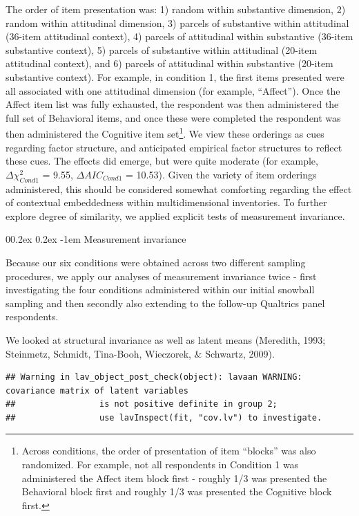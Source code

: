 \documentclass[
  man]{apa6}
\makeatletter
\let\oldparagraph\paragraph
\renewcommand{\paragraph}[1]{\oldparagraph{#1}\mbox{}}
\renewcommand{\paragraph}{\@startsection{paragraph}{4}{\parindent}%
  {0\baselineskip \@plus 0.2ex \@minus 0.2ex}%
  {-1em}%
  {\normalfont\normalsize\bfseries\itshape\typesectitle}}
\makeatother
\begin{document}
The order of item presentation was: 1) random within substantive dimension, 2) random within attitudinal dimension, 3) parcels of substantive within attitudinal (36-item attitudinal context), 4) parcels of attitudinal within substantive (36-item substantive context), 5) parcels of substantive within attitudinal (20-item attitudinal context), and 6) parcels of attitudinal within substantive (20-item substantive context). For example, in condition 1, the first items presented were all associated with one attitudinal dimension (for example, ``Affect''). Once the Affect item list was fully exhausted, the respondent was then administered the full set of Behavioral items, and once these were completed the respondent was then administered the Cognitive item set\footnote{Across conditions, the order of presentation of item ``blocks'' was also randomized. For example, not all respondents in Condition 1 was administered the Affect item block first - roughly 1/3 was presented the Behavioral block first and roughly 1/3 was presented the Cognitive block first.}. We view these orderings as cues regarding factor structure, and anticipated empirical factor structures to reflect these cues. The effects did emerge, but were quite moderate (for example, \(\Delta{\chi^2_{Cond1}}\) = 9.55, \(\Delta{AIC_{Cond1}}\) = 10.53). Given the variety of item orderings administered, this should be considered somewhat comforting regarding the effect of contextual embeddedness within multidimensional inventories. To further explore degree of similarity, we applied explicit tests of measurement invariance.

\hypertarget{measurement-invariance}{%
\paragraph{Measurement invariance}\label{measurement-invariance}}

Because our six conditions were obtained across two different sampling procedures, we apply our analyses of measurement invariance twice - first investigating the four conditions administered within our initial snowball sampling and then secondly also extending to the follow-up Qualtrics panel respondents.

We looked at structural invariance as well as latent means (Meredith, 1993; Steinmetz, Schmidt, Tina-Booh, Wieczorek, \& Schwartz, 2009).

\begin{verbatim}
## Warning in lav_object_post_check(object): lavaan WARNING: covariance matrix of latent variables
##                 is not positive definite in group 2;
##                 use lavInspect(fit, "cov.lv") to investigate.
\end{verbatim}
\end{document}
